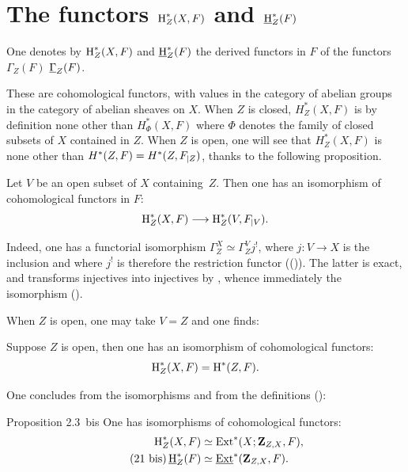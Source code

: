 \section{The functors $\operatorname{H}_Z^*(X, F)$ and $\operatorname{\underline{H}}_Z^*(F)$} \label{I.2}

\setcounter{equation}{18}

\begin{definition} \label{I.2.1}
One denotes by $\operatorname{H}_Z^*(X, F)$ and ${\operatorname{\underline{H}}}_Z^*(F)$ the derived functors in $F$ of the functors $\Gamma_Z(F)$ \resp $\underline{\Gamma}_Z(F)$.
\end{definition}

These are cohomological functors, with values in the category of abelian groups \resp in the category of abelian sheaves on $X$. When $Z$ is closed, $H_Z^*(X, F)$ is by definition none other than $H^*_{\Phi}(X, F)$ where $\Phi$ denotes the family of closed subsets of $X$ contained in $Z$. When $Z$ is open, one will see that $H_Z^*(X, F)$ is none other than $H^*(Z, F)=H^*(Z, F_{|Z})$, thanks to the following proposition.

\begin{proposition} \label{I.2.2}
Let $V$ be an open subset of $X$ containing~$Z$. Then one has an isomorphism of cohomological functors in $F$:
\begin{equation} \label{eq:I.19}
\H^*_Z(X, F) \to \H^*_Z(V, F\rest{V}).
\end{equation}
\end{proposition}

Indeed, one has a functorial isomorphism $\Gamma_Z^X \simeq \Gamma_Z^V j^!$, where $j: V \to X$ is the inclusion and where $j^!$ is therefore the restriction functor (\cf ()). The latter is exact, and transforms injectives into injectives by , whence immediately the isomorphism ().

When $Z$ is open, one may take $V=Z$ and one finds:

\begin{corollary} \label{I.2.3bof}
Suppose $Z$ is open, then one has an isomorphism of cohomological functors:
\begin{equation} \label{eq:I.20}
\operatorname{H}_Z^*(X, F) = \operatorname{H}^*(Z, F).
\end{equation}
\end{corollary}

One concludes from the isomorphisms  and from the definitions (\cf \cite{Tohoku}):

\label{I.2.3bis}
\begin{enonce*}{Proposition 2.3~bis\ndemark}
One has isomorphisms of cohomological functors:
\begin{align} \label{eq:I.21}
\operatorname{H}_Z^*(X, F)&\simeq \operatorname{Ext}^*(X; \mathbf{Z}_{Z, X}, F),\\
\label{eq:I.21bis}\tag{21 bis}
\operatorname{\underline{H}}_Z^*(F)&\simeq \operatorname{\underline{Ext}}^*(\mathbf{Z}_{Z, X}, F).
\end{align}
\end{enonce*}

